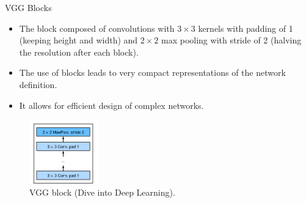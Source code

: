 \begin{vbframe}{VGG Blocks}
  \begin{itemize}
    \item The block composed of convolutions with $3 \times 3$  kernels with padding of 1 (keeping height and width) and $2 \times 2$  max pooling with stride of 2 (halving the resolution after each block).
    \item The use of blocks leads to very compact representations of the network definition. 
    \item It allows for efficient design of complex networks.
  \end{itemize}
  
    \begin{figure}
  \centering
    \includegraphics[width=3cm]{plots/moderncnn/vggblock.png}
    \caption{VGG block (Dive into Deep Learning).}
  \end{figure}
  
\end{vbframe}



